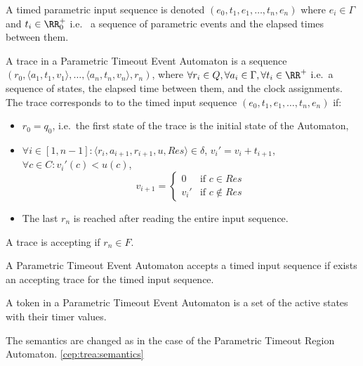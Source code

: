 		\begin{dfn}
			\label{dfn:cep:ptea:inputseq}
			A timed parametric input sequence is denoted $(e_0, t_1, e_1, \dots, t_n, e_n)$ where $e_i \in \Gamma$ and $t_i \in \RR^+_0$ i.e.~ a sequence of parametric events and the elapsed times between them.
		\end{dfn}
		
		\begin{dfn}
			\label{dfn:cep:ptea:trace}

			A trace in a Parametric Timeout Event Automaton is a sequence
			$(r_0, \langle a_1, t_1, v_1\rangle, \dots, \langle a_n, t_n, v_n \rangle, r_n)$, where $\forall r_i \in Q, \forall a_i \in \Gamma, \forall t_i \in \RR^+$ i.e.~a sequence of states, the elapsed time between them, and the clock assignments. The trace corresponds to to the timed input sequence $(e_0, t_1, e_1, \dots, t_n, e_n)$ if:
			\begin{itemize}
				\item $r_0 = q_0$, i.e.~the first state of the trace is the initial state of the Automaton,
				\item $\forall i \in [1,n - 1] \colon \langle r_i, a_{i+1}, r_{i+1}, u, \mathit{Res} \rangle \in \delta$, 
				${v_i}' = v_i + t_{i+1}$, $\forall c \in C \colon {v_i}'(c) < u(c)$,\\
				$$v_{i+1} = \begin{cases}
				0      & \text{if\ } c \in    \mathit{Res} \\
				{v_i}' & \text{if\ } c \notin \mathit{Res}
				\end{cases}$$
				\item The last $r_n$ is reached after reading the entire input sequence.	
			\end{itemize}
			A trace is accepting if $r_n \in F$.
		\end{dfn}
		
		\begin{dfn}
			\label{dfn:cep:ptea:accepting}
			A Parametric Timeout Event Automaton accepts a timed input sequence if exists an accepting trace for the timed input sequence.
		\end{dfn}
		
		\begin{dfn}
			\label{dfn:cep:ptea:token}
			A token in a Parametric Timeout Event Automaton is a set of the active states with their timer values.
		\end{dfn}
		
		The semantics are changed as in the case of the Parametric Timeout Region Automaton. \cref{cep:trea:semantics}
		

